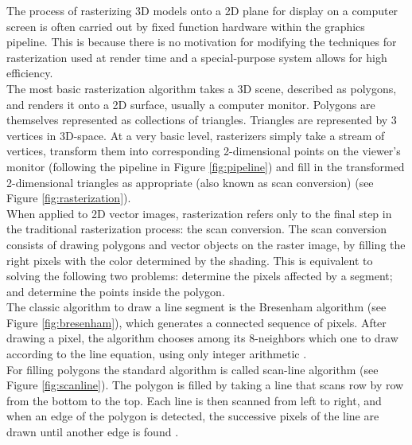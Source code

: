 \documentclass[]{usiinfbachelorproject}
\begin{document}
The process of rasterizing 3D models onto a 2D plane for display on a computer screen is often carried out by fixed function hardware within the graphics pipeline. This is because there is no motivation for modifying the techniques for rasterization used at render time and a special-purpose system allows for high efficiency.\\
The most basic rasterization algorithm takes a 3D scene, described as polygons, and renders it onto a 2D surface, usually a computer monitor. Polygons are themselves represented as collections of triangles. Triangles are represented by 3 vertices in 3D-space. At a very basic level, rasterizers simply take a stream of vertices, transform them into corresponding 2-dimensional points on the viewer's monitor (following the pipeline in Figure \ref{fig:pipeline}) and fill in the transformed 2-dimensional triangles as appropriate (also known as scan conversion) \cite{Wiki:rasterization} (see Figure \ref{fig:rasterization}).\\
When applied to 2D vector images, rasterization refers only to the final step in the traditional rasterization process: the scan conversion. The scan conversion consists of drawing polygons and vector objects on the raster image, by filling the right pixels with the color determined by the shading. This is equivalent to solving the following two problems: determine the pixels affected by a segment; and determine the points inside the polygon.\\
The classic algorithm to draw a line segment is the Bresenham algorithm (see Figure \ref{fig:bresenham}), which generates a connected sequence of pixels. After drawing a pixel, the algorithm chooses among its 8-neighbors which one to draw according to the line equation, using only integer arithmetic \cite{Wiki:bresenham}.\\
For filling polygons the standard algorithm is called scan-line algorithm (see Figure \ref{fig:scanline}). The polygon is filled by taking a line that scans row by row from the bottom to the top. Each line is then scanned from left to right, and when an edge of the polygon is detected, the successive pixels of the line are drawn until another edge is found \cite{Wiki:scanline}.
\end{document}
